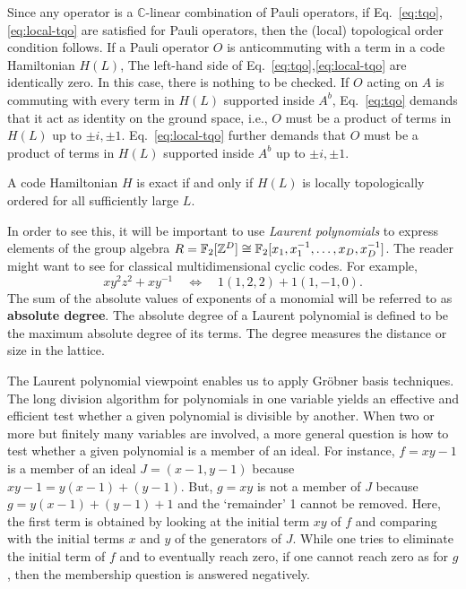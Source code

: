 Since any operator is a $\mathbb{C}$-linear combination of Pauli operators,
if Eq.~\eqref{eq:tqo},\eqref{eq:local-tqo} are satisfied for Pauli operators,
then the (local) topological order condition follows.
If a Pauli operator $O$ is anticommuting with a term in a code Hamiltonian $H(L)$,
The left-hand side of Eq.~\eqref{eq:tqo},\eqref{eq:local-tqo} are identically zero.
In this case, there is nothing to be checked.
If $O$ acting on $A$ is commuting with every term in $H(L)$ supported inside $A^b$,
Eq.~\eqref{eq:tqo} demands that it act as identity on the ground space,
i.e., $O$ must be a product of terms in $H(L)$ up to $\pm i,\pm 1$.
Eq.~\eqref{eq:local-tqo} further demands that
$O$ must be a product of terms in $H(L)$ supported inside $A^b$ up to $\pm i,\pm 1$.

\begin{lem}
A code Hamiltonian $H$ is exact
if and only if $H(L)$ is locally topologically ordered for
all sufficiently large $L$.
\label{lem:local-tqo=exact}
\end{lem}
In order to see this, it will be important to use {\em Laurent polynomials}
to express elements of the group algebra 
$R = \mathbb{F}_2[\mathbb{Z}^D] \cong \mathbb{F}_2[x_1,x_1^{-1},\ldots,x_D,x_D^{-1}]$.
The reader might want to see \cite{Imai1977TDC,GueneriOezbudak2008} for classical multidimensional cyclic codes.
For example, 
\[
 x y^2 z^2 + x y^{-1} \quad \Longleftrightarrow \quad 1(1,2,2)+1(1,-1,0) .
\]
The sum of the absolute values of exponents of a monomial will be referred to as {\bf absolute degree}.
The absolute degree of a Laurent polynomial is defined to be the maximum absolute degree of its terms.
The degree measures the distance or size in the lattice.


The Laurent polynomial viewpoint enables us to apply Gr\"obner basis techniques.
The long division algorithm for polynomials in one variable yields an effective and efficient
test whether a given polynomial is divisible by another.
When two or more but finitely many variables are involved,
a more general question is how to test
whether a given polynomial is a member of an ideal.
For instance, $f=xy-1$ is a member of an ideal $J = (x-1,y-1)$
because $xy -1 = y(x-1) + (y-1)$.
But, $g=xy$ is not a member of $J$ because $g = y(x-1) + (y-1) + 1$ and the `remainder' 1 cannot be removed.
Here, the first term is obtained by looking at the initial term $xy$ of $f$
and comparing with the initial terms $x$ and $y$ of the generators of $J$.
While one tries to eliminate the initial term of $f$ and to eventually reach zero,
if one cannot reach zero as for $g$, then the membership question is answered negatively.

